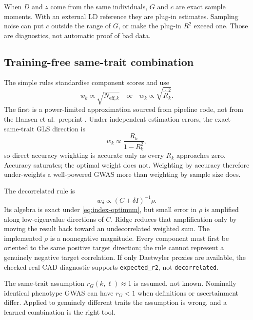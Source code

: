 \documentclass[11pt,a4paper]{article}
\newcommand{\code}[1]{\texttt{#1}}
\newcommand{\Rtwo}{\(R^2\)}
\begin{document}
When \(D\) and \(z\) come from the same individuals, \(G\) and
\(c\) are exact sample moments. With an external LD reference
they are plug-in estimates. Sampling noise can put \(c\) outside
the range of \(G\), or make the plug-in \Rtwo{} exceed one.
Those are diagnostics, not automatic proof of bad data.

\subsection{Training-free same-trait combination}
\label{sec:meta}

The simple rules standardise component scores and use
\begin{equation}
  w_k\propto\sqrt{N_{\mathrm{eff},k}}
  \quad\text{or}\quad
  w_k\propto\sqrt{\widehat R_k^2}.
  \label{eq:meta-simple}
\end{equation}
The first is a power-limited approximation sourced from pipeline
code, not from the Hansen et al.\ preprint \cite{hansen2026}.
Under independent estimation errors, the exact same-trait GLS
direction is
\begin{equation}
  w_k\propto\frac{R_k}{1-R_k^2},
  \label{eq:meta-gls}
\end{equation}
so direct accuracy weighting is accurate only as every \(R_k\)
approaches zero. Accuracy saturates; the optimal weight does
not. Weighting by accuracy therefore under-weights a
well-powered GWAS more than weighting by sample size does.

The decorrelated rule is
\begin{equation}
  w_\delta\propto(C+\delta I)^{-1}\rho.
  \label{eq:meta-decorrelated}
\end{equation}
Its algebra is exact under \eqref{eq:index-optimum}, but small
error in \(\rho\) is amplified along low-eigenvalue directions
of \(C\). Ridge reduces that amplification only by moving the
result back toward an undecorrelated weighted sum. The
implemented \(\rho\) is a nonnegative magnitude. Every component
must first be oriented to the same positive target direction;
the rule cannot represent a genuinely negative target
correlation. If only Daetwyler proxies are available, the
checked real CAD diagnostic supports \code{expected\_r2}, not
\code{decorrelated}.

The same-trait assumption \(r_G(k,\ell)\approx 1\) is assumed,
not known. Nominally identical phenotype GWAS can have
\(r_G<1\) when definitions or ascertainment differ. Applied to
genuinely different traits the assumption is wrong, and a
learned combination is the right tool.
\end{document}
